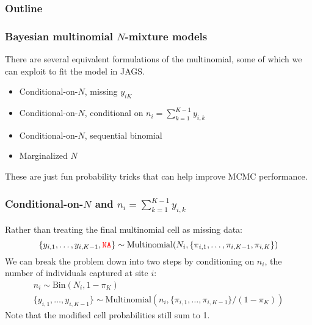 \documentclass[color=usenames,dvipsnames]{beamer}\usepackage[]{graphicx}\usepackage[]{color}
\begin{document}
\begin{frame}
  \frametitle{Outline}
  \Large
\end{frame}


\begin{frame}
  \frametitle{Bayesian multinomial $N$-mixture models}
  There are several equivalent formulations of the multinomial, some
  of which we can exploit to fit the model in JAGS.
  \begin{itemize}
    \item Conditional-on-$N$, missing $y_{iK}$
    \item Conditional-on-$N$, conditional on $n_i=\sum_{k=1}^{K-1} y_{i,k}$
    \item Conditional-on-$N$, sequential binomial
    \item Marginalized $N$
  \end{itemize}
  \pause
  \vfill
  These are just fun probability tricks that can help improve MCMC performance. \\
\end{frame}









\begin{frame}[fragile]
  \frametitle{\normalsize Conditional-on-$N$ and $n_i=\sum_{k=1}^{K-1} y_{i,k}$}
  Rather than treating the final multinomial cell as missing data:
  \[
    \{y_{i,1}, \dots, y_{i,K-1}, \mathtt{\color{red} NA}\} \sim
    \mathrm{Multinomial}(N_i, \{\pi_{i,1}, \dots, \pi_{i,K-1}, \pi_{i,K}\})
  \]
  \pause
  \vfill
  We can break the problem down into two steps by conditioning on
  $n_i$, the number of individuals captured at site $i$:
  \small
  \begin{gather*}
    n_i \sim \mathrm{Bin}(N_i, 1-\pi_K) \\
    \{y_{i,1}, \dots, y_{i,K-1}\} \sim \mathrm{Multinomial}(n_i,
    \{\pi_{i,1}, \dots, \pi_{i,K-1}\}/(1-\pi_K))
  \end{gather*}
  \pause
  \vfill
  Note that the modified cell probabilities still sum to 1. 
\end{frame}
\end{document}
